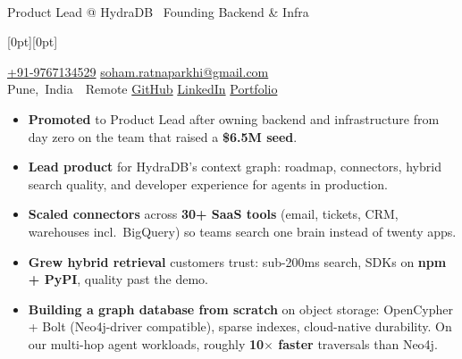 \documentclass[10pt,a4paper,ragged2e]{altacv}
\makeatletter
\newcommand{\printinfoline}[2]{\mbox{\textcolor{accent}{#1}\hspace{0.5em}\textcolor{body}{#2}}}
\renewcommand{\makecvheader}{%
  \begingroup\leavevmode
  \begin{minipage}[t]{1.0\textwidth}
    \raggedright
    {\namefont\Huge \@name}\\[0.4ex]
    {\large\textcolor{body}{Product Lead @ HydraDB \textbullet\ Founding Backend \& Infra}}
  \end{minipage}%
  \raisebox{1.0ex}[0pt][0pt]{%
    \begin{minipage}[t]{1.0\textwidth}
      \raggedleft
      \printinfoline{\faPhone}{\href{tel:+919767134529}{+91-9767134529}} \quad
      \printinfoline{\faEnvelopeO}{\href{mailto:soham.ratnaparkhi@gmail.com}{soham.ratnaparkhi@gmail.com}} \\
      \vspace{0.5ex}
      \printinfoline{\faMapMarker}{Pune, India \textbullet\ Remote} \quad
      \printinfoline{\faGithub}{\href{https://github.com/SohamRatnaparkhi}{GitHub}} \quad
      \printinfoline{\faLinkedin}{\href{https://www.linkedin.com/in/soham-ratnaparkhi-3a3775ab/}{LinkedIn}} \quad
      \printinfoline{\faHome}{\href{https://sohamratnaparkhi.com}{Portfolio}}
    \end{minipage}%
  }
  \vspace{1.5ex}
  \endgroup
}
\makeatother
\begin{document}

\begin{fullwidth}
\makecvheader
\end{fullwidth}



\begin{itemize}[leftmargin=*]
    \item \textbf{Promoted} to Product Lead after owning backend and infrastructure from day zero on the team that raised a \textbf{\$6.5M seed}.
    \item \textbf{Lead product} for HydraDB's context graph: roadmap, connectors, hybrid search quality, and developer experience for agents in production.
    \item \textbf{Scaled connectors} across \textbf{30+ SaaS tools} (email, tickets, CRM, warehouses incl.\ BigQuery) so teams search one brain instead of twenty apps.
    \item \textbf{Grew hybrid retrieval} customers trust: sub-200ms search, SDKs on \textbf{npm + PyPI}, quality past the demo.
    \item \textbf{Building a graph database from scratch} on object storage: OpenCypher + Bolt (Neo4j-driver compatible), sparse indexes, cloud-native durability. On our multi-hop agent workloads, roughly \textbf{10$\times$ faster} traversals than Neo4j.
\end{itemize}
\vspace{-0.5em}
\divider
\vspace{-0.35em}
\end{document}
